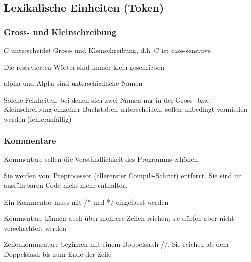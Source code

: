  	\subsection{Lexikalische Einheiten (Token)}
 		\subsubsection{Gross- und Kleinschreibung}
 			\begin{compactitem}
 				\item C unterscheidet Gross- und Kleinschreibung, d.h. C ist case-sensitive
 				\item Die reservierten Wörter sind immer klein geschrieben
 				\item alpha und Alpha sind unterschiedliche Namen
 				\item Solche Feinheiten, bei denen sich zwei Namen nur in der Gross- bzw. Kleinschreibung einzelner Buchstaben unterscheiden, sollen unbedingt vermieden werden (fehleranfällig)
 			\end{compactitem}
 		\subsubsection{Kommentare}
 			\begin{compactitem}
 				\item Kommentare sollen die Verständlichkeit des Programms erhöhen
 				\item Sie werden vom Preprocessor (allererster Compile-Schritt) entfernt. Sie sind im
 				ausführbaren Code nicht mehr enthalten.
 				\item Ein Kommentar muss mit
 				/* und */ eingefasst werden
 				\item Kommentare können auch über mehrere Zeilen reichen, sie dürfen aber nicht
 				verschachtelt werden
 				\item Zeilenkommentare beginnen mit einem Doppelslash
 				//. Sie reichen ab dem
 				Doppelslash bis zum Ende der Zeile
 			\end{compactitem}
